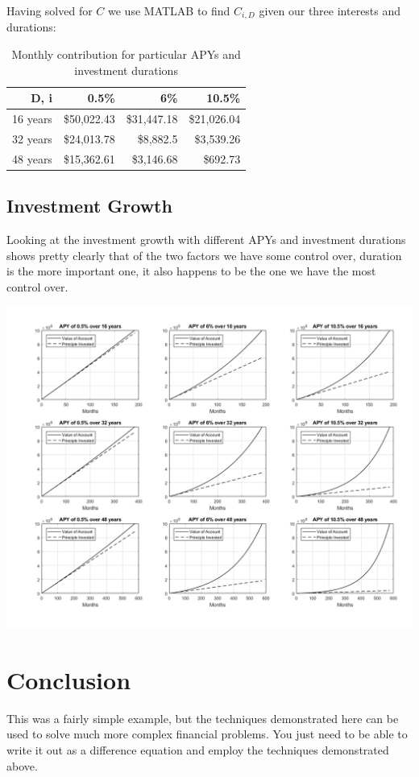\documentclass[letterpaper]{article}
\begin{document}
Having solved for $C$ we use MATLAB to find $C_{i,D}$ given our three interests and durations:
\begin{table}[h]
	\centering
	\begin{tabular}{|r|r|r|r|}
		\hline 
		D, i & 0.5\% & 6\% & 10.5\% \\ 
		\hline 
		16 years & \$50,022.43 & \$31,447.18 & \$21,026.04 \\ 
		\hline 
		32 years & \$24,013.78 & \$8,882.5 & \$3,539.26 \\ 
		\hline 
		48 years & \$15,362.61 & \$3,146.68 & \$692.73 \\ 
		\hline 
	\end{tabular} 
	\caption[Table 1:]{Monthly contribution for particular APYs and investment durations}
\end{table}

\pagebreak
\subsection{Investment Growth}
Looking at the investment growth with different APYs and investment durations shows pretty clearly that of the two factors we have some control over, duration is the more important one, it also happens to be the one we have the most control over. 
\begin{center}
	\includegraphics[width=1\linewidth]{../matlab/investment_growth.png}
\end{center}


\section{Conclusion}
This  was a fairly simple example, but the techniques demonstrated here can be used to solve much more complex financial problems. You just need to be able to write it out as a difference equation and employ the techniques demonstrated above.
\end{document}
